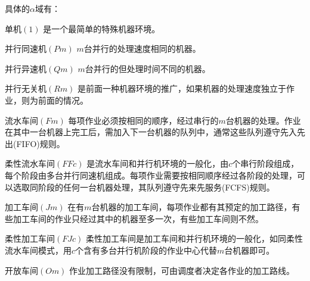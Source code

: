具体的$\alpha$域有：
\begin{compactdesc}
\item[单机$(1)$]是一个最简单的特殊机器环境。
\item[并行同速机$(Pm)$]$m$台并行的处理速度相同的机器。
\item[并行异速机$(Qm)$]$m$台并行的但处理时间不同的机器。
\item[并行无关机$(Rm)$]是前面一种机器环境的推广，如果机器的处理速度独立于作业，则为前面的情况。
\item[流水车间$(Fm)$]每项作业必须按相同的顺序，经过串行的$m$台机器的处理。作业在其中一台机器上完工后，需加入下一台机器的队列中，通常这些队列遵守先入先出(FIFO)规则。
\item[柔性流水车间$(FFc)$]是流水车间和并行机环境的一般化，由$c$个串行阶段组成，每个阶段由多台并行同速机组成。每项作业需要按相同顺序经过各阶段的处理，可以选取同阶段的任何一台机器处理，其队列遵守先来先服务(FCFS)规则。
\item[加工车间$(Jm)$]在有$m$台机器的加工车间，每项作业都有其预定的加工路径，有些加工车间的作业只经过其中的机器至多一次，有些加工车间则不然。
\item[柔性加工车间$(FJc)$]柔性加工车间是加工车间和并行机环境的一般化，如同柔性流水车间模式，用$c$个含有多台并行机阶段的作业中心代替$m$台机器即可。
\item[开放车间$(Om)$]作业加工路径没有限制，可由调度者决定各作业的加工路线。
\end{compactdesc}

